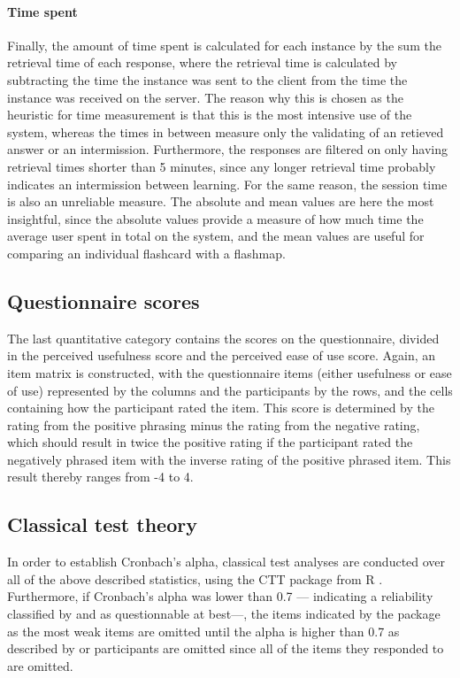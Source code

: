 \paragraph{Time spent} Finally, the amount of time spent is calculated for each instance by the sum the retrieval time of each response, where the retrieval time is calculated by subtracting the time the instance was sent to the client from the time the instance was received on the server. The reason why this is chosen as the heuristic for time measurement is that this is the most intensive use of the system, whereas the times in between measure only the validating of an retieved answer or an intermission. Furthermore, the responses are filtered on only having retrieval times shorter than 5 minutes, since any longer retrieval time probably indicates an intermission between learning. For the same reason, the session time is also an unreliable measure. The absolute and mean values are here the most insightful, since the absolute values provide a measure of how much time the average user spent in total on the system, and the mean values are useful for comparing an individual flashcard with a flashmap. 

\subsection{Questionnaire scores}

The last quantitative category contains the scores on the questionnaire, divided in the perceived usefulness score and the perceived ease of use score. Again, an item matrix is constructed, with the questionnaire items (either usefulness or ease of use) represented by the columns and the participants by the rows, and the cells containing how the participant rated the item. This score is determined by the rating from the positive phrasing minus the rating from the negative rating, which should result in twice the positive rating if the participant rated the negatively phrased item with the inverse rating of the positive phrased item. This result thereby ranges from -4 to 4.

\subsection{Classical test theory}

In order to establish Cronbach's alpha, classical test analyses are conducted over all of the above described statistics, using the CTT package from R \cite{ctt}. Furthermore, if Cronbach's alpha was lower than 0.7 --- indicating a reliability classified by  and  as questionnable at best---, the items indicated by the package as the most weak items are omitted until the alpha is higher than 0.7 as described by  or participants are omitted since all of the items they responded to are omitted.

